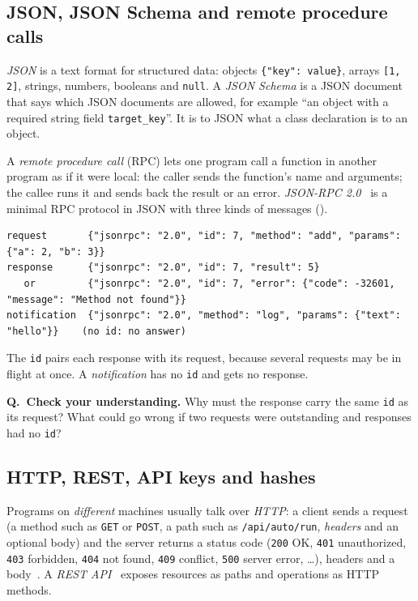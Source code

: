 \documentclass[10pt,a4paper]{article}
\newcommand{\code}[1]{\texttt{#1}}
\newcounter{think}
\newenvironment{think}[1][Check your understanding]{%
  \refstepcounter{think}%
  \begin{tcolorbox}[enhanced, breakable, colback=thinkbg, colframe=thinkbg, arc=0pt, boxrule=0pt,
     borderline west={2.2pt}{0pt}{thinkbar}, left=8pt, right=8pt, top=5pt, bottom=5pt,
     before skip=8pt, after skip=8pt]
  \textsf{\bfseries\color{thinkbar}Q\thethink.\ #1.}\enspace}{\end{tcolorbox}}
\begin{document}
\subsection{JSON, JSON Schema and remote procedure calls}

\emph{JSON} is a text format for structured data: objects
\code{\{"key": value\}}, arrays \code{[1, 2]}, strings, numbers, booleans
and \code{null}. A \emph{JSON Schema} is a JSON document that says which
JSON documents are allowed, for example ``an object with a required string
field \code{target\_key}''. It is to JSON what a class declaration is to an
object.

A \emph{remote procedure call} (RPC) lets one program call a function in
another program as if it were local: the caller sends the function's name
and arguments; the callee runs it and sends back the result or an error.
\emph{JSON-RPC 2.0}~\cite{jsonrpc2010} is a minimal RPC protocol in JSON
with three kinds of messages ().

\begin{lstlisting}[style=wire, caption={Illustrative: the three kinds of JSON-RPC 2.0 messages.}, label={lst:jsonrpc}]
request       {"jsonrpc": "2.0", "id": 7, "method": "add", "params": {"a": 2, "b": 3}}
response      {"jsonrpc": "2.0", "id": 7, "result": 5}
   or         {"jsonrpc": "2.0", "id": 7, "error": {"code": -32601, "message": "Method not found"}}
notification  {"jsonrpc": "2.0", "method": "log", "params": {"text": "hello"}}    (no id: no answer)
\end{lstlisting}

The \code{id} pairs each response with its request, because several requests
may be in flight at once. A \emph{notification} has no \code{id} and gets no
response.

\begin{think}
Why must the response carry the same \code{id} as its request? What could
go wrong if two requests were outstanding and responses had no \code{id}?
\end{think}

\subsection{HTTP, REST, API keys and hashes}

Programs on \emph{different} machines usually talk over \emph{HTTP}: a
client sends a request (a method such as \code{GET} or \code{POST}, a path
such as \code{/api/auto/run}, \emph{headers} and an optional body) and the
server returns a status code (\code{200} OK, \code{401} unauthorized,
\code{403} forbidden, \code{404} not found, \code{409} conflict, \code{500}
server error, \ldots), headers and a body~\cite{rfc9110}. A \emph{REST
API}~\cite{fielding2000rest} exposes resources as paths and operations as
HTTP methods.
\end{document}

